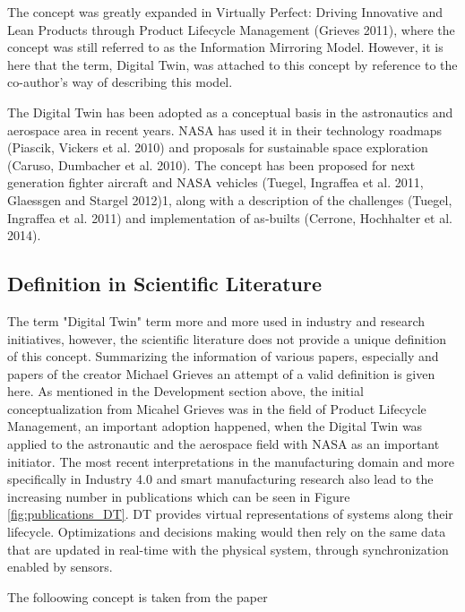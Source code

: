 The concept was greatly expanded in Virtually Perfect: Driving Innovative
and Lean Products through Product Lifecycle Management (Grieves 2011),
where the concept was still referred to as the Information Mirroring Model.
However, it is here that the term, Digital Twin, was attached to this concept by
reference to the co-author’s way of describing this model.

The Digital Twin has been adopted as a conceptual basis in the
astronautics and aerospace area in recent years. NASA has used it in their
technology roadmaps (Piascik, Vickers et al. 2010) and proposals for sustainable
space exploration (Caruso, Dumbacher et al. 2010). The concept has been
proposed for next generation fighter aircraft and NASA vehicles (Tuegel,
Ingraffea et al. 2011, Glaessgen and Stargel 2012)1, along with a description of
the challenges (Tuegel, Ingraffea et al. 2011) and implementation of as-builts
(Cerrone, Hochhalter et al. 2014).

\cite{grieves2016origin}




\subsection{Definition in Scientific Literature}

The term "Digital Twin" term more and more used in industry and research initiatives, however, the scientific literature does not provide a unique definition of this concept. Summarizing the information of various papers, especially \cite{negri2017review} and papers of the creator Michael Grieves an attempt of a valid definition is given here. 
As mentioned in the Development section above, the initial conceptualization from Micahel Grieves was in the field of Product Lifecycle Management, an important adoption happened, when the Digital Twin was applied to the astronautic and
the aerospace field with NASA as an important initiator. The most recent interpretations in the manufacturing domain and more specifically in Industry 4.0 and smart  manufacturing research also lead to the increasing number in publications which can be seen in Figure \ref{fig:publications_DT}. DT provides virtual representations of systems along their lifecycle. Optimizations and decisions making would then rely on the same data that are updated in real-time with the physical system, through synchronization enabled by sensors.

The folloowing concept is taken from the paper \cite{negri2017review} 

